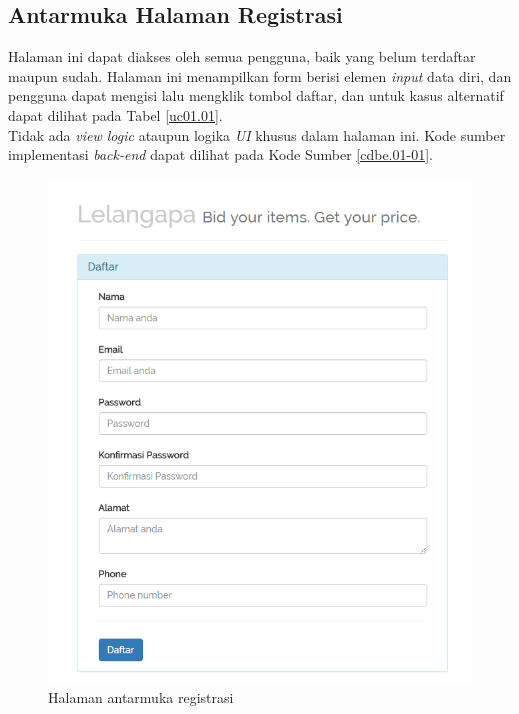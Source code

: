 \subsection{Antarmuka Halaman Registrasi}    
    Halaman ini dapat diakses oleh semua pengguna, baik yang belum terdaftar maupun sudah. Halaman ini menampilkan form berisi elemen \textit{input} data diri, dan pengguna dapat mengisi lalu mengklik tombol daftar, dan untuk kasus alternatif dapat dilihat pada Tabel \ref{uc01.01}.\\
	\indent Tidak ada \textit{view logic} ataupun logika \textit{UI} khusus dalam halaman ini. Kode sumber implementasi \textit{back-end} dapat dilihat pada Kode Sumber \ref{cdbe.01-01}.

  \begin{figure}[H]
    \centering
    \includegraphics[width=\textwidth]{images/bab4/ui/01-01.png}
    \caption{Halaman antarmuka registrasi}
    \label{ui.01-01}
  \end{figure}
  
